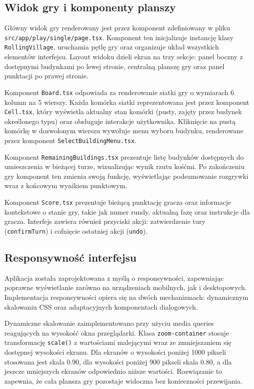 \documentclass[12pt, a4paper]{article}
\begin{document}
\subsection{Widok gry i komponenty planszy}

Główny widok gry renderowany jest przez komponent zdefiniowany w pliku \texttt{src/app/play/single/page.tsx}. Komponent ten inicjalizuje instancję klasy \texttt{RollingVillage}, uruchamia pętlę gry oraz organizuje układ wszystkich elementów interfejsu. Layout widoku dzieli ekran na trzy sekcje: panel boczny z dostępnymi budynkami po lewej stronie, centralną planszę gry oraz panel punktacji po prawej stronie.

Komponent \texttt{Board.tsx} odpowiada za renderowanie siatki gry o wymiarach 6 kolumn na 5 wierszy. Każda komórka siatki reprezentowana jest przez komponent \texttt{Cell.tsx}, który wyświetla aktualny stan komórki (pusty, zajęty przez budynek określonego typu) oraz obsługuje interakcje użytkownika. Kliknięcie na pustą komórkę w dozwolonym wierszu wywołuje menu wyboru budynku, renderowane przez komponent \texttt{SelectBuildingMenu.tsx}.

Komponent \texttt{RemainingBuildings.tsx} prezentuje listę budynków dostępnych do umieszczenia w bieżącej turze, wizualizując wynik rzutu kośćmi. Po zakończeniu gry komponent ten zmienia swoją funkcję, wyświetlając podsumowanie rozgrywki wraz z końcowym wynikiem punktowym.

Komponent \texttt{Score.tsx} prezentuje bieżącą punktację gracza oraz informacje kontekstowe o stanie gry, takie jak numer rundy, aktualną fazę oraz instrukcje dla gracza. Interfejs zawiera również przyciski akcji: zatwierdzenie tury (\texttt{confirmTurn}) i cofnięcie ostatniej akcji (\texttt{undo}).

\subsection{Responsywność interfejsu}

Aplikacja została zaprojektowana z myślą o responsywności, zapewniając poprawne wyświetlanie zarówno na urządzeniach mobilnych, jak i desktopowych. Implementacja responsywności opiera się na dwóch mechanizmach: dynamicznym skalowaniu CSS oraz adaptacyjnych komponentach dialogowych.

Dynamiczne skalowanie zaimplementowano przy użyciu media queries reagujących na wysokość okna przeglądarki. Klasa \texttt{zoom-container} stosuje transformację \texttt{scale()} z wartościami malejącymi wraz ze zmniejszaniem się dostępnej wysokości ekranu. Dla ekranów o wysokości poniżej 1000 pikseli stosowana jest skala 0.90, dla wysokości poniżej 900 pikseli skala 0.80, a dla jeszcze mniejszych ekranów odpowiednio niższe wartości. Rozwiązanie to zapewnia, że cała plansza gry pozostaje widoczna bez konieczności przewijania.
\end{document}
